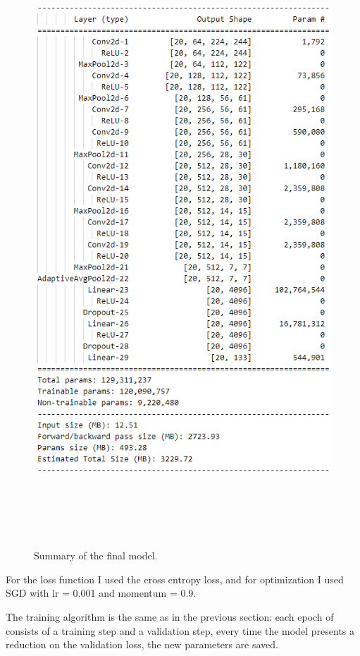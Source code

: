 \documentclass{article}
\begin{document}
    \begin{figure}[htbp]
        \centering
        \includegraphics[height=650pt]{img/model_summary_transfer.png}
        \caption{Summary of the final model.}
        \label{fig:summary_transfer}
    \end{figure}

    For the loss function I used the cross entropy loss, and for optimization I used SGD with lr = 0.001 and momentum = 0.9.

    The training algorithm is the same as in the previous section: each epoch of consists of a training step and a validation step, every time the model presents a reduction on the validation loss, the new parameters are saved.
\end{document}
